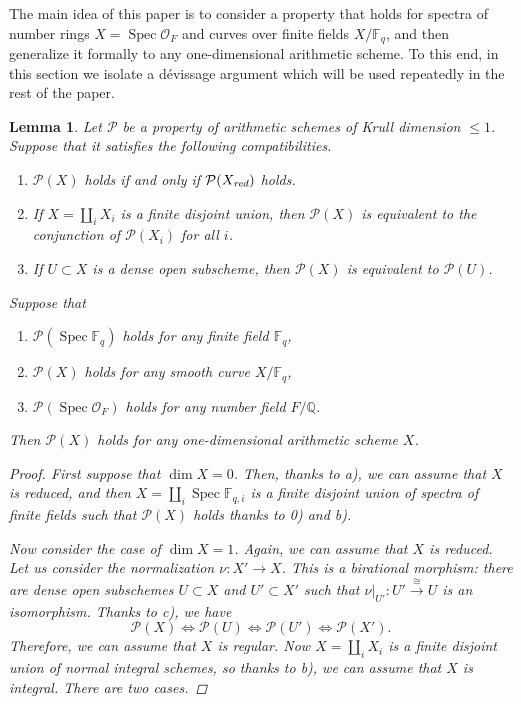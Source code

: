 \documentclass[draft]{article}
\DeclareMathOperator{\Spec}{Spec}
\newcommand{\FF}{\mathbb{F}}
\newcommand{\QQ}{\mathbb{Q}}
\newcommand{\red}{\text{\it red}}
\theoremstyle{myplain}
\newtheorem{lemma}[theorem]{Lemma}
\theoremstyle{mydefinition}
\begin{document}
The main idea of this paper is to consider a property that holds for spectra of
number rings $X = \Spec \mathcal{O}_F$ and curves over finite fields $X/\FF_q$,
and then generalize it formally to any one-dimensional arithmetic scheme.
To this end, in this section we isolate a d\'{e}vissage argument which will be
used repeatedly in the rest of the paper.

\begin{lemma}
  \label{lemma:devissage}
  Let $\mathcal{P}$ be a property of arithmetic schemes of Krull dimension
  $\le 1$. Suppose that it satisfies the following compatibilities.
  \begin{enumerate}
  \item[a)] $\mathcal{P} (X)$ holds if and only if $\mathcal{P} (X_\red)$ holds.

  \item[b)] If $X = \coprod_i X_i$ is a finite disjoint union, then
    $\mathcal{P} (X)$ is equivalent to the conjunction of $\mathcal{P} (X_i)$ for
    all $i$.

  \item[c)] If $U \subset X$ is a dense open subscheme, then $\mathcal{P} (X)$
    is equivalent to $\mathcal{P} (U)$.
  \end{enumerate}
  Suppose that
  \begin{enumerate}
  \item[0)] $\mathcal{P} (\Spec \FF_q)$ holds for any finite field $\FF_q$,

  \item[1)] $\mathcal{P} (X)$ holds for any smooth curve $X/\FF_q$,

  \item[2)] $\mathcal{P} (\Spec \mathcal{O}_F)$ holds for any number field
    $F/\QQ$.
  \end{enumerate}
  Then $\mathcal{P} (X)$ holds for any one-dimensional arithmetic scheme $X$.

  \begin{proof}
    First suppose that $\dim X = 0$. Then, thanks to a), we can assume that $X$
    is reduced, and then $X = \coprod_i \Spec \FF_{q,i}$ is a finite disjoint
    union of spectra of finite fields such that $\mathcal{P} (X)$ holds thanks
    to 0) and b).

    Now consider the case of $\dim X = 1$. Again, we can assume that $X$ is
    reduced. Let us consider the normalization $\nu\colon X' \to X$. This is a
    birational morphism: there are dense open subschemes $U \subset X$ and
    $U' \subset X'$ such that
    $\left.\nu\right|_{U'}\colon U' \xrightarrow{\cong} U$ is an
    isomorphism. Thanks to c), we have
    \[ \mathcal{P} (X) \iff
      \mathcal{P} (U) \iff
      \mathcal{P} (U') \iff
      \mathcal{P} (X'). \]
    Therefore, we can assume that $X$ is regular. Now $X = \coprod_i X_i$ is a
    finite disjoint union of normal integral schemes, so thanks to b), we can
    assume that $X$ is integral. There are two cases.


\end{proof}
\end{lemma}
\end{document}
